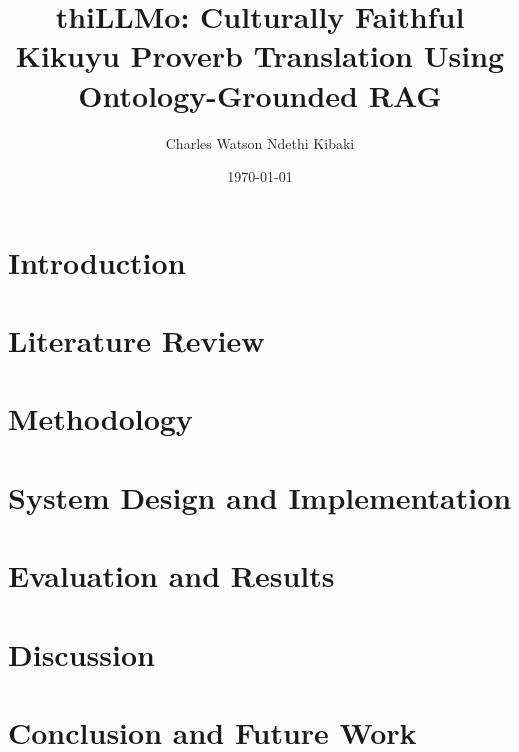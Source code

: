 \documentclass[12pt,a4paper]{report}
\title{thiLLMo: Culturally Faithful Kikuyu Proverb Translation Using Ontology-Grounded RAG}
\author{Charles Watson Ndethi Kibaki}
\date{\today}
\begin{document}
\maketitle

\tableofcontents
\listoffigures
\listoftables

\chapter{Introduction}


\chapter{Literature Review}


\chapter{Methodology}


\chapter{System Design and Implementation}


\chapter{Evaluation and Results}


\chapter{Discussion}


\chapter{Conclusion and Future Work}





% 
\end{document}

